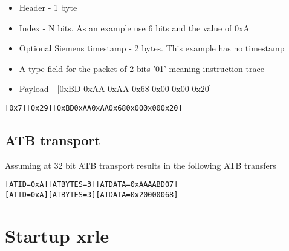 \begin{itemize}
\item
  Header - 1 byte
\item
  Index - N bits. As an example use 6 bits and the value of 0xA
\item
  Optional Siemens timestamp - 2 bytes. This example has no timestamp
\item
A type field for the packet of 2 bits '01' meaning instruction trace  
\item
  Payload - [0xBD 0xAA 0xAA 0x68 0x00 0x00 0x20]
\end{itemize}

\begin {alltt}
[0x7][0x29][0xBD 0xAA 0xAA 0x68 0x00 0x00 0x20]
\end{alltt}

\subsection{ATB transport}

Assuming at 32 bit ATB transport results in the following ATB transfers

\begin {alltt}
[ATID=0xA] [ATBYTES = 3] [ATDATA = 0xAAAABD07]
[ATID=0xA] [ATBYTES = 3] [ATDATA = 0x20000068]
\end{alltt}



\section{Startup xrle}

